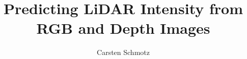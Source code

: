 \documentclass[11pt, twoside, openright, a4paper]{studdipl}
\title{Predicting LiDAR Intensity from RGB and Depth Images}
\author{Carsten Schmotz}
\begin{document}
	
	\maketitle
	\cleardoublepage
	
	\tableofcontents
	
	\mainbody
	
	
	
	\begin{appendix}
		
	\end{appendix}
	\printbibliography
	
	
	
\end{document}
